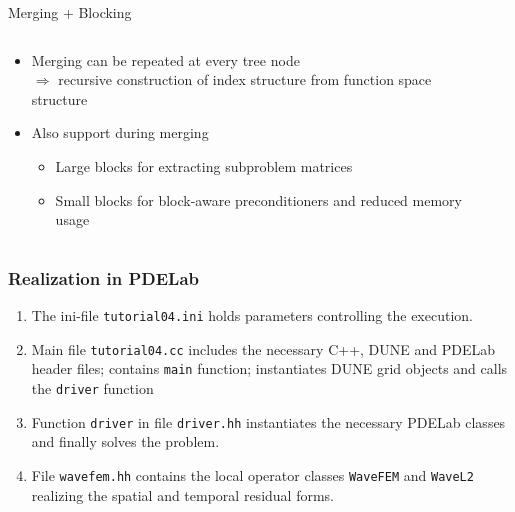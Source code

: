 \documentclass[aspectratio=169,11pt]{beamer}
\theoremstyle{definition}
\begin{document}
\begin{frame}{Merging + Blocking}
  \begin{columns}
    \begin{column}{0.6\textwidth}
      \begin{itemize}
      \item Merging can be repeated at every tree node\\
{\small $\Rightarrow$ recursive construction of index structure from function space structure}
\item Also support  during merging
{\small
  \begin{itemize}
  \item Large blocks for extracting subproblem matrices
  \item Small blocks for block-aware preconditioners and
    reduced memory usage
  \end{itemize}
}
      \end{itemize}
\resizebox{\textwidth}{!}{


}
    \end{column}
    \begin{column}{0.4\textwidth}
\resizebox{0.8\textwidth}{!}{
  
}
\ \\[1em]
\resizebox{0.8\textwidth}{!}{
  
}

    \end{column}
  \end{columns}
\end{frame}

\begin{frame}
\frametitle{Realization in PDELab}
\begin{enumerate}[1)]
\item The ini-file
\lstinline{tutorial04.ini} holds parameters
controlling the execution.
\item Main file \lstinline{tutorial04.cc} includes the necessary C++,
DUNE and PDELab header files;
contains \lstinline{main} function;
instantiates DUNE grid objects and calls the \lstinline{driver} function
\item Function \lstinline{driver} in file \lstinline{driver.hh} instantiates
the necessary PDELab classes and finally solves the problem.
\item File \lstinline{wavefem.hh} contains the local operator classes
\lstinline{WaveFEM} and \lstinline{WaveL2} realizing the spatial
and temporal residual forms.
\end{enumerate}
\end{frame}

\begin{frame}


\end{frame}
\end{document}
